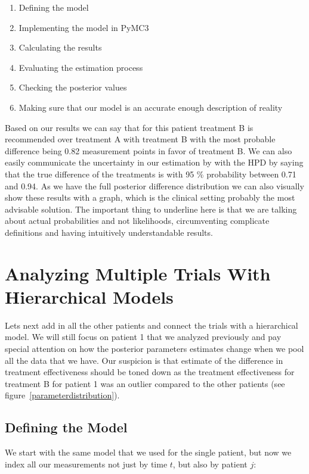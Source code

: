 \documentclass[12pt,a4paper,leqno]{report}
\theoremstyle{plain}
\theoremstyle{definition}
\theoremstyle{remark}
\begin{document}
\begin{enumerate}
    \item Defining the model
    \item Implementing the model in PyMC3
    \item Calculating the results
    \item Evaluating the estimation process
    \item Checking the posterior values
    \item Making sure that our model is an accurate enough description of reality
\end{enumerate}

Based on our results we can say that for this patient treatment B is recommended over treatment A with
treatment B with the most probable difference being 0.82 measurement points in favor of treatment B. We can also easily communicate
the uncertainty in our estimation by with the HPD by saying that the true difference of
the treatments is with 95 \% probability between 0.71 and 0.94. As we have the full
posterior difference distribution we can also visually show these results with a graph,
which is the clinical setting probably the most advisable solution. The important thing
to underline here is that we are talking about actual probabilities and not likelihoods,
circumventing complicate definitions and having intuitively understandable results.

\section{Analyzing Multiple Trials With Hierarchical Models}\label{pooling}

Lets next add in all the other patients and connect the trials with a hierarchical
model. We will still focus on patient 1 that we analyzed previously and pay special
attention on how the posterior parameters estimates change when we pool all the data
that we have. Our suspicion is that estimate of the difference in treatment effectiveness
should be toned down as the treatment effectiveness for treatment B for patient 1 was an
outlier compared to the other patients (see figure\ \ref{parameterdistribution}).

\subsection{Defining the Model}\label{hiermodel}

We start with the same model that we used for the single patient, but now we index all our
measurements not just by time \(t\), but also by patient \(j\):
\end{document}
